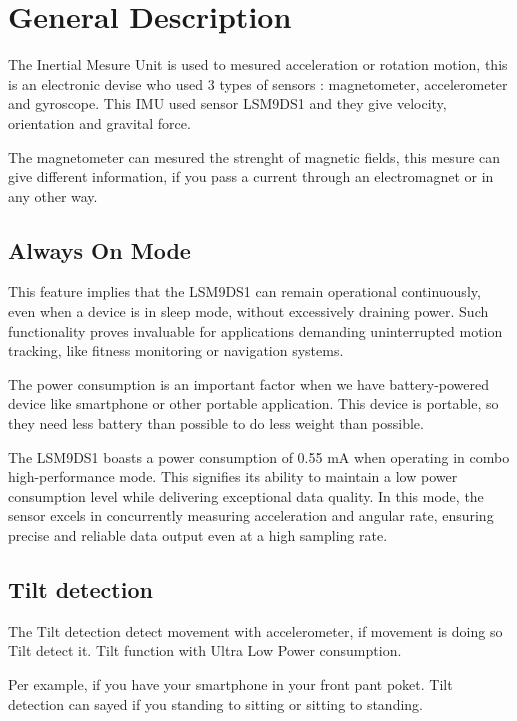 \section{General Description }

The Inertial Mesure Unit is used to mesured acceleration or rotation motion, this is an electronic devise who used  3 types of sensors :  magnetometer, accelerometer and gyroscope. 
This IMU used sensor LSM9DS1 and they give velocity, orientation and gravital force. 

The magnetometer can mesured the strenght of magnetic fields, this mesure can give different information, if you pass a current through an electromagnet or in any other way.

\subsection{Always On Mode}

This feature implies that the LSM9DS1 can remain operational continuously, even when a device is in sleep mode, without excessively draining power. Such functionality proves invaluable for applications demanding uninterrupted motion tracking, like fitness monitoring or navigation systems.

\bigskip

The power consumption is an important factor when we have battery-powered device like smartphone or other portable application.  This device is portable, so they need less battery than possible to do less weight than possible. 

\bigskip

The LSM9DS1 boasts a power consumption of 0.55 mA when operating in combo high-performance mode. This signifies its ability to maintain a low power consumption level while delivering exceptional data quality. In this mode, the sensor excels in concurrently measuring acceleration and angular rate, ensuring precise and reliable data output even at a high sampling rate.


\subsection{Tilt detection}

The Tilt detection detect movement with accelerometer, if movement is doing so Tilt detect it. Tilt function with Ultra Low Power consumption. 

Per example, if you have your smartphone in your front pant poket. Tilt detection can sayed if you standing to sitting or sitting to standing.

